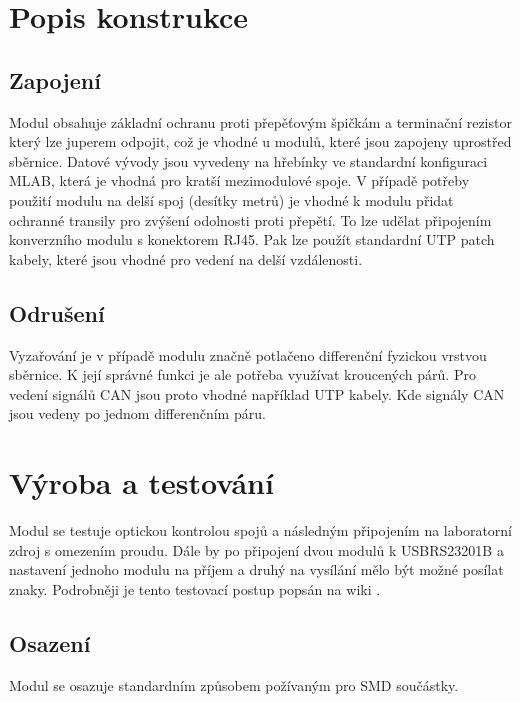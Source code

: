 \documentclass[12pt,a4paper,oneside]{article}
\begin{document}
\newpage
\section{Popis konstrukce}

\subsection{Zapojení}
Modul obsahuje základní ochranu proti přepěťovým špičkám a terminační rezistor který lze juperem odpojit, což je vhodné u modulů, které jsou zapojeny uprostřed sběrnice.  Datové vývody  jsou vyvedeny na hřebínky ve standardní konfiguraci MLAB, která je vhodná pro kratší mezimodulové spoje. V případě potřeby použití modulu na delší spoj (desítky metrů) je vhodné k modulu přidat ochranné transily pro zvýšení odolnosti proti přepětí. To lze udělat připojením konverzního modulu s konektorem RJ45. Pak lze použít standardní UTP patch kabely, které jsou vhodné pro vedení na delší vzdálenosti.   



\subsection{Odrušení}

Vyzařování je v případě modulu značně potlačeno  differenční fyzickou vrstvou sběrnice.  K její správné funkci je ale potřeba využívat kroucených párů.  Pro vedení signálů CAN jsou proto vhodné například UTP kabely. Kde signály CAN jsou vedeny po jednom differenčním páru.   

\section{Výroba a testování}

Modul se testuje optickou kontrolou spojů a následným připojením na laboratorní zdroj s omezením proudu. Dále by po připojení dvou modulů k USBRS23201B a nastavení jednoho modulu na příjem a druhý na vysílání mělo být možné posílat znaky. Podrobněji je tento testovací postup popsán na wiki \cite{wiki-TTLCAN}.


\subsection{Osazení}

Modul se osazuje standardním způsobem požívaným pro SMD součástky. 
\end{document}
